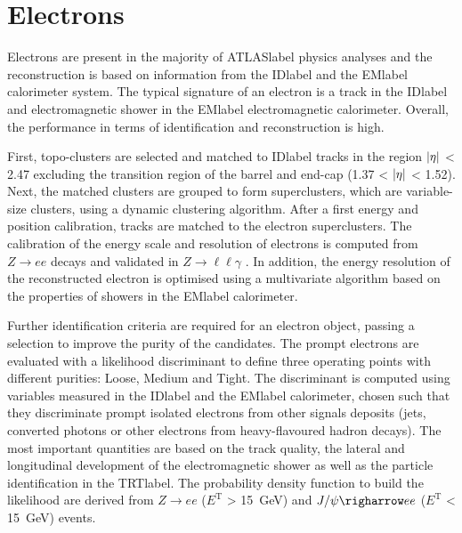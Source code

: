 \section{Electrons}

Electrons are present in the majority of \acrshort{ATLASlabel} physics analyses and the reconstruction is based on information from the \acrshort{IDlabel} and the \acrshort{EMlabel} calorimeter system. The typical signature of an electron is a track in the \acrshort{IDlabel} and electromagnetic shower in the \acrshort{EMlabel} electromagnetic calorimeter. Overall, the performance in terms of identification and reconstruction is high.

First, topo-clusters are selected and matched to \acrshort{IDlabel} tracks in the region $\abs{\eta}$ < 2.47 excluding the transition region of the barrel and end-cap (1.37 < $\abs{\eta}$ < 1.52). Next, the matched clusters are grouped to form superclusters, which are variable-size clusters, using a dynamic clustering algorithm. After a first energy and position calibration, tracks are matched to the electron superclusters. The calibration of the energy scale and resolution of electrons is computed from $Z\rightarrow ee$ decays and validated in $Z\rightarrow \ell\ell\gamma$ %
. In addition, the energy resolution of the reconstructed electron is optimised using a multivariate algorithm based on the properties of showers in the \acrshort{EMlabel} calorimeter.


Further identification criteria are required for an electron object, passing a selection to improve the purity of the candidates. The prompt electrons are evaluated with a likelihood discriminant to define three operating points with different purities: Loose, Medium and Tight. The discriminant is computed using variables measured in the \acrshort{IDlabel} and the \acrshort{EMlabel} calorimeter, chosen such that they discriminate prompt isolated electrons from other signals
deposits (jets, converted photons or other electrons from heavy-flavoured hadron
decays). The most important quantities are based on the track quality, the lateral and longitudinal development of the electromagnetic shower as well as the particle identification in the \acrshort{TRTlabel}. The probability density function to build the likelihood are derived from $Z\rightarrow ee$ ($E^\text{T}$ > 15~GeV) and $J/\psi \righarrow ee$ ($E^\text{T}$ < 15~GeV) events.

